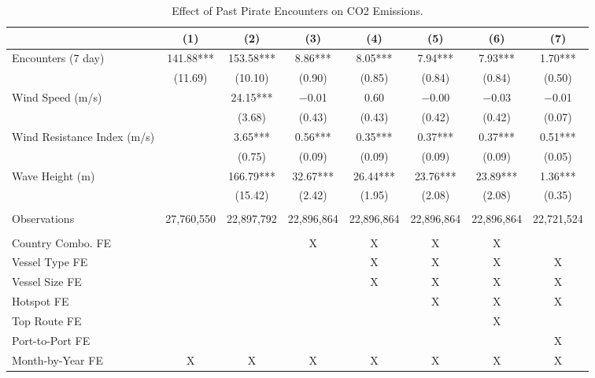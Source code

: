 \begin{table}
\centering
\caption{Effect of Past Pirate Encounters on CO2 Emissions. \label{tab:spec-co2-table}}
\centering
\begin{adjustbox}{width = .9\textwidth}
\begin{threeparttable}
\begin{tabular}[t]{lccccccc}
\toprule
  & (1) & (2) & (3) & (4) & (5) & (6) & (7)\\
\midrule
Encounters (7 day) & \num{141.88}*** & \num{153.58}*** & \num{8.86}*** & \num{8.05}*** & \num{7.94}*** & \num{7.93}*** & \num{1.70}***\\
 & (\num{11.69}) & (\num{10.10}) & (\num{0.90}) & (\num{0.85}) & (\num{0.84}) & (\num{0.84}) & (\num{0.50})\\
Wind Speed (m/s) &  & \num{24.15}*** & \num{-0.01} & \num{0.60} & \num{-0.00} & \num{-0.03} & \num{-0.01}\\
 &  & (\num{3.68}) & (\num{0.43}) & (\num{0.43}) & (\num{0.42}) & (\num{0.42}) & (\num{0.07})\\
Wind Resistance Index (m/s) &  & \num{3.65}*** & \num{0.56}*** & \num{0.35}*** & \num{0.37}*** & \num{0.37}*** & \num{0.51}***\\
 &  & (\num{0.75}) & (\num{0.09}) & (\num{0.09}) & (\num{0.09}) & (\num{0.09}) & (\num{0.05})\\
Wave Height (m) &  & \num{166.79}*** & \num{32.67}*** & \num{26.44}*** & \num{23.76}*** & \num{23.89}*** & \num{1.36}***\\
 &  & (\num{15.42}) & (\num{2.42}) & (\num{1.95}) & (\num{2.08}) & (\num{2.08}) & (\num{0.35})\\
 &  &  &  &  &  &  & \\
Observations & 27,760,550 & 22,897,792 & 22,896,864 & 22,896,864 & 22,896,864 & 22,896,864 & 22,721,524\\
 &  &  &  &  &  &  & \\
Country Combo. FE &  &  & X & X & X & X & \\
Vessel Type FE &  &  &  & X & X & X & X\\
Vessel Size FE &  &  &  & X & X & X & X\\
Hotspot FE &  &  &  &  & X & X & X\\
Top Route FE &  &  &  &  &  & X & \\
Port-to-Port FE &  &  &  &  &  &  & X\\
Month-by-Year FE & X & X & X & X & X & X & X\\
\bottomrule
\end{tabular}

\end{threeparttable}
\end{adjustbox}
\end{table}
